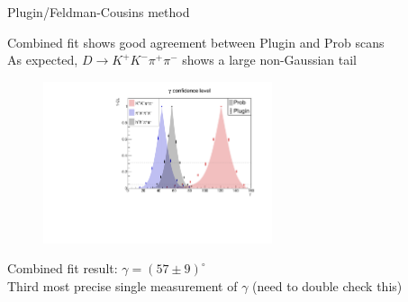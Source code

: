 \documentclass[xcolor={dvipsnames}]{beamer}
\begin{document}
\begin{frame}{Plugin/Feldman-Cousins method}
  \begin{center}
    Combined fit shows good agreement between Plugin and Prob scans \\
    As expected, $D\to K^+K^-\pi^+\pi^-$ shows a large non-Gaussian tail
  \end{center}
  \begin{figure}
    \centering
    \includegraphics[width=0.6\textwidth]{Plots/gamma_plugin_scan.pdf}
  \end{figure}
  \vspace{-0.3cm}
  \begin{center}
    Combined fit result: $\gamma = (57 \pm 9)^\circ$\\
    Third most precise single measurement of $\gamma$ {\color{blue}(need to double check this)}
  \end{center}
\end{frame}
\end{document}
